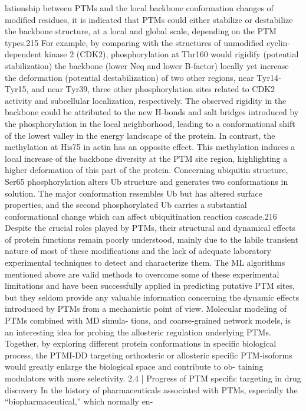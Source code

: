 lationship between PTMs and the local backbone conformation changes of modified residues, it is indicated that
PTMs could either stabilize or destabilize the backbone structure, at a local and global scale, depending on the
PTM types.215 For example, by comparing with the structures of unmodified cyclin‐dependent kinase 2 (CDK2),
phosphorylation at Thr160 would rigidify (potential stabilization) the backbone (lower Neq and lower B‐factor)
locally yet increase the deformation (potential destabilization) of two other regions, near Tyr14‐Tyr15, and near
Tyr39, three other phosphorylation sites related to CDK2 activity and subcellular localization, respectively. The
observed rigidity in the backbone could be attributed to the new H‐bonds and salt bridges introduced by the
phosphorylation in the local neighborhood, leading to a conformational shift of the lowest valley in the energy
landscape of the protein. In contrast, the methylation at His75 in actin has an opposite effect. This methylation
induces a local increase of the backbone diversity at the PTM site region, highlighting a higher deformation of this
part of the protein. Concerning ubiquitin structure, Ser65 phosphorylation alters Ub structure and generates two
conformations in solution. The major conformation resembles Ub but has altered surface properties, and the
second phosphorylated Ub carries a substantial conformational change which can affect ubiquitination reaction
cascade.216
Despite the crucial roles played by PTMs, their structural and dynamical effects of protein functions remain
poorly understood, mainly due to the labile transient nature of most of these modifications and the lack of
adequate laboratory experimental techniques to detect and characterize them. The ML algorithms mentioned
above are valid methods to overcome some of these experimental limitations and have been successfully applied in
predicting putative PTM sites, but they seldom provide any valuable information concerning the dynamic effects
introduced by PTMs from a mechanistic point of view. Molecular modeling of PTMs combined with MD simula-
tions, and coarse‐grained network models, is an interesting idea for probing the allosteric regulation underlying
PTMs. Together, by exploring different protein conformations in specific biological process, the PTMI‐DD targeting
orthosteric or allosteric specific PTM‐isoforms would greatly enlarge the biological space and contribute to ob-
taining modulators with more selectivity.
2.4
|
Progress of PTM specific targeting in drug discovery
In the history of pharmaceuticals associated with PTMs, especially the “biopharmaceutical,” which normally en-
